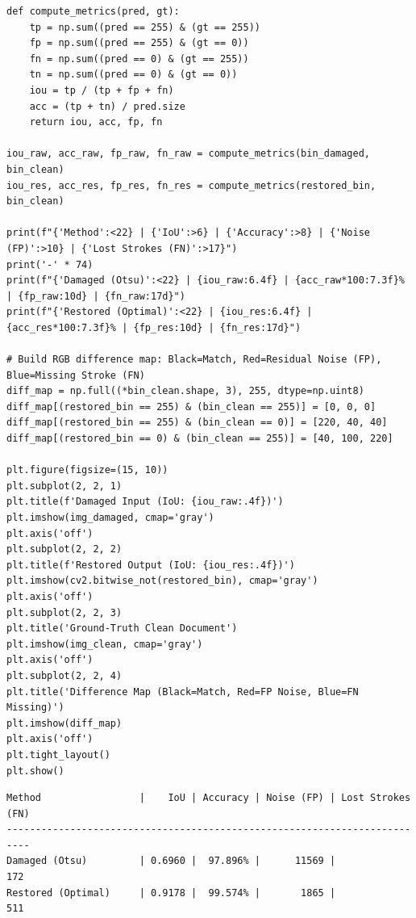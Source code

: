 \documentclass[12pt]{article}
\begin{document}
\begin{lstlisting}[style=code, caption={Quantitative evaluation and 4-panel visual comparison}]
def compute_metrics(pred, gt):
    tp = np.sum((pred == 255) & (gt == 255))
    fp = np.sum((pred == 255) & (gt == 0))
    fn = np.sum((pred == 0) & (gt == 255))
    tn = np.sum((pred == 0) & (gt == 0))
    iou = tp / (tp + fp + fn)
    acc = (tp + tn) / pred.size
    return iou, acc, fp, fn

iou_raw, acc_raw, fp_raw, fn_raw = compute_metrics(bin_damaged, bin_clean)
iou_res, acc_res, fp_res, fn_res = compute_metrics(restored_bin, bin_clean)

print(f"{'Method':<22} | {'IoU':>6} | {'Accuracy':>8} | {'Noise (FP)':>10} | {'Lost Strokes (FN)':>17}")
print('-' * 74)
print(f"{'Damaged (Otsu)':<22} | {iou_raw:6.4f} | {acc_raw*100:7.3f}% | {fp_raw:10d} | {fn_raw:17d}")
print(f"{'Restored (Optimal)':<22} | {iou_res:6.4f} | {acc_res*100:7.3f}% | {fp_res:10d} | {fn_res:17d}")

# Build RGB difference map: Black=Match, Red=Residual Noise (FP), Blue=Missing Stroke (FN)
diff_map = np.full((*bin_clean.shape, 3), 255, dtype=np.uint8)
diff_map[(restored_bin == 255) & (bin_clean == 255)] = [0, 0, 0]
diff_map[(restored_bin == 255) & (bin_clean == 0)] = [220, 40, 40]
diff_map[(restored_bin == 0) & (bin_clean == 255)] = [40, 100, 220]

plt.figure(figsize=(15, 10))
plt.subplot(2, 2, 1)
plt.title(f'Damaged Input (IoU: {iou_raw:.4f})')
plt.imshow(img_damaged, cmap='gray')
plt.axis('off')
plt.subplot(2, 2, 2)
plt.title(f'Restored Output (IoU: {iou_res:.4f})')
plt.imshow(cv2.bitwise_not(restored_bin), cmap='gray')
plt.axis('off')
plt.subplot(2, 2, 3)
plt.title('Ground-Truth Clean Document')
plt.imshow(img_clean, cmap='gray')
plt.axis('off')
plt.subplot(2, 2, 4)
plt.title('Difference Map (Black=Match, Red=FP Noise, Blue=FN Missing)')
plt.imshow(diff_map)
plt.axis('off')
plt.tight_layout()
plt.show()
\end{lstlisting}

\begin{lstlisting}[style=output, caption={Console Output: Quantitative Benchmark vs. Clean Reference}]
Method                 |    IoU | Accuracy | Noise (FP) | Lost Strokes (FN)
--------------------------------------------------------------------------
Damaged (Otsu)         | 0.6960 |  97.896% |      11569 |               172
Restored (Optimal)     | 0.9178 |  99.574% |       1865 |               511
\end{lstlisting}
\end{document}
